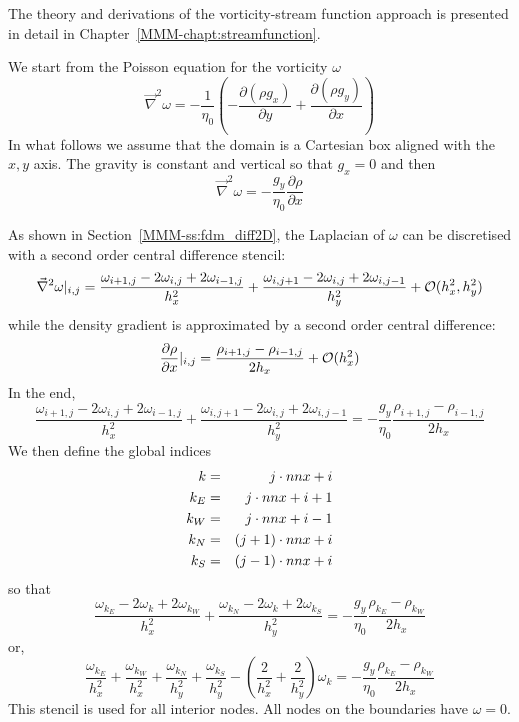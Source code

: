 The theory and derivations of the vorticity-stream function approach is 
presented in detail in Chapter~\ref{MMM-chapt:streamfunction}.

We start from the Poisson equation for the vorticity $\omega$
\begin{equation}
\vec\nabla^2 \omega = -\frac{1}{\eta_0} \left( -\frac{\partial (\rho g_x)}{\partial y}
+\frac{\partial (\rho g_y)}{\partial x} \right)
\end{equation}
In what follows we assume that the domain is a Cartesian box aligned 
with the $x,y$ axis. The gravity is constant and vertical so that $g_x=0$ and
then 
\begin{equation}
\vec\nabla^2 \omega 
= -\frac{g_y}{\eta_0} 
\frac{\partial \rho}{\partial x} 
\end{equation}

As shown in Section~\ref{MMM-ss:fdm_diff2D}, the Laplacian of $\omega$
can be discretised with a second order central difference stencil:
\[
\vec\nabla^2 \omega |_{i,j} 
= \frac{\omega_{i+1,j} -2\omega_{i,j} + 2\omega_{i-1,j}}{h_x^2}
+ \frac{\omega_{i,j+1} -2\omega_{i,j} + 2\omega_{i,j-1}}{h_y^2}
+{\cal O}(h_x^2,h_y^2)
\]
while the density gradient is approximated by a second order
central difference:
\[
\frac{\partial \rho}{\partial x}|_{i,j} 
= \frac{\rho_{i+1,j}-\rho_{i-1,j}}{2 h_x} + {\cal O}(h_x^2)
\]
In the end, 
\[
\frac{\omega_{i+1,j} -2\omega_{i,j} + 2\omega_{i-1,j}}{h_x^2}
+ \frac{\omega_{i,j+1} -2\omega_{i,j} + 2\omega_{i,j-1}}{h_y^2}
= -\frac{g_y}{\eta_0} 
\frac{\rho_{i+1,j}-\rho_{i-1,j}}{2 h_x} 
\]
We then define the global indices
\begin{eqnarray}
k  &=& j \cdot nnx + i \nonumber\\
k_E &=& j \cdot nnx + i+1 \nonumber\\
k_W &=& j \cdot nnx + i-1 \nonumber\\
k_N &=& (j+1) \cdot nnx + i \nonumber\\
k_S &=& (j-1) \cdot nnx + i \nonumber
\end{eqnarray}
so that 
\[
\frac{\omega_{k_E} -2\omega_{k} + 2\omega_{k_W}}{h_x^2}
+ 
\frac{\omega_{k_N} -2\omega_{k} + 2\omega_{k_S}}{h_y^2}
= -\frac{g_y}{\eta_0} 
\frac{\rho_{k_E}-\rho_{k_W}}{2 h_x} 
\]
or, 
\[
\frac{\omega_{k_E}}{h_x^2}+
\frac{\omega_{k_W}}{h_x^2}+
\frac{\omega_{k_N}}{h_y^2}+
\frac{\omega_{k_S}}{h_y^2}-
\left(\frac{2}{h_x^2} + \frac{2}{h_y^2} \right) \omega_k
= -\frac{g_y}{\eta_0} 
\frac{\rho_{k_E}-\rho_{k_W}}{2 h_x} 
\]
This stencil is used for all interior nodes. All nodes on the boundaries 
have $\omega=0$.

